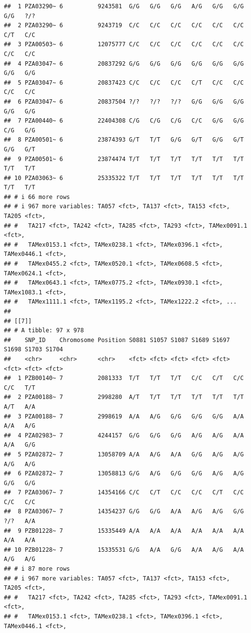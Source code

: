 \documentclass[
]{article}
\begin{document}
\begin{verbatim}
##  1 PZA03290~ 6          9243581  G/G   G/G   G/G   A/G   G/G   G/G   G/G   ?/?  
##  2 PZA03290~ 6          9243719  C/C   C/C   C/C   C/C   C/C   C/C   C/T   C/C  
##  3 PZA00503~ 6          12075777 C/C   C/C   C/C   C/C   C/C   C/C   C/C   C/C  
##  4 PZA03047~ 6          20837292 G/G   G/G   G/G   G/G   G/G   G/G   G/G   G/G  
##  5 PZA03047~ 6          20837423 C/C   C/C   C/C   C/T   C/C   C/C   C/C   C/C  
##  6 PZA03047~ 6          20837504 ?/?   ?/?   ?/?   G/G   G/G   G/G   G/G   G/G  
##  7 PZA00440~ 6          22404308 C/G   C/G   C/G   C/C   G/G   G/G   C/G   G/G  
##  8 PZA00501~ 6          23874393 G/T   T/T   G/G   G/T   G/G   G/T   G/G   G/T  
##  9 PZA00501~ 6          23874474 T/T   T/T   T/T   T/T   T/T   T/T   T/T   T/T  
## 10 PZA03063~ 6          25335322 T/T   T/T   T/T   T/T   T/T   T/T   T/T   T/T  
## # i 66 more rows
## # i 967 more variables: TA057 <fct>, TA137 <fct>, TA153 <fct>, TA205 <fct>,
## #   TA217 <fct>, TA242 <fct>, TA285 <fct>, TA293 <fct>, TAMex0091.1 <fct>,
## #   TAMex0153.1 <fct>, TAMex0238.1 <fct>, TAMex0396.1 <fct>, TAMex0446.1 <fct>,
## #   TAMex0455.2 <fct>, TAMex0520.1 <fct>, TAMex0608.5 <fct>, TAMex0624.1 <fct>,
## #   TAMex0643.1 <fct>, TAMex0775.2 <fct>, TAMex0930.1 <fct>, TAMex1083.1 <fct>,
## #   TAMex1111.1 <fct>, TAMex1195.2 <fct>, TAMex1222.2 <fct>, ...
## 
## [[7]]
## # A tibble: 97 x 978
##    SNP_ID    Chromosome Position S0881 S1057 S1087 S1689 S1697 S1698 S1703 S1704
##    <chr>     <chr>      <chr>    <fct> <fct> <fct> <fct> <fct> <fct> <fct> <fct>
##  1 PZB00140~ 7          2081333  T/T   T/T   T/T   C/C   C/T   C/C   C/C   T/T  
##  2 PZA00188~ 7          2998280  A/T   T/T   T/T   T/T   T/T   T/T   A/T   A/A  
##  3 PZA00188~ 7          2998619  A/A   A/G   G/G   G/G   G/G   A/A   A/A   A/G  
##  4 PZA02983~ 7          4244157  G/G   G/G   G/G   A/G   A/G   A/A   A/A   G/G  
##  5 PZA02872~ 7          13058709 A/A   A/G   A/A   G/G   A/G   A/G   A/G   A/G  
##  6 PZA02872~ 7          13058813 G/G   A/G   G/G   G/G   A/G   A/G   G/G   G/G  
##  7 PZA03067~ 7          14354166 C/C   C/T   C/C   C/C   C/T   C/C   C/C   C/C  
##  8 PZA03067~ 7          14354237 G/G   G/G   A/A   A/G   A/G   G/G   ?/?   A/A  
##  9 PZB01228~ 7          15335449 A/A   A/A   A/A   A/A   A/A   A/A   A/A   A/A  
## 10 PZB01228~ 7          15335531 G/G   A/A   G/G   A/A   A/G   A/A   A/G   A/G  
## # i 87 more rows
## # i 967 more variables: TA057 <fct>, TA137 <fct>, TA153 <fct>, TA205 <fct>,
## #   TA217 <fct>, TA242 <fct>, TA285 <fct>, TA293 <fct>, TAMex0091.1 <fct>,
## #   TAMex0153.1 <fct>, TAMex0238.1 <fct>, TAMex0396.1 <fct>, TAMex0446.1 <fct>,

\end{verbatim}
\end{document}
